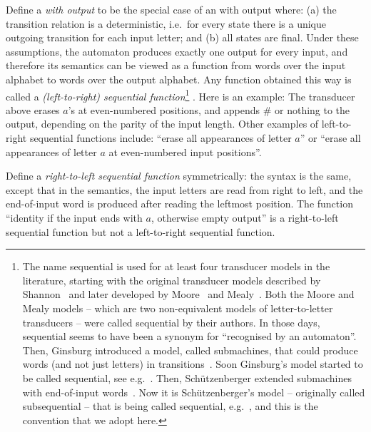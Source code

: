  Define a \emph{\dfa with output} to be the special case of an \nfa with output where: (a) the transition relation is a deterministic, i.e.~for every state there is a unique outgoing transition for each input letter; and (b) all states are final. Under these assumptions, the automaton produces exactly one output for every input, and therefore its  semantics can be viewed as a function from words over the input alphabet to words over the output alphabet. Any function obtained this way is called  a \emph{(left-to-right) sequential function}\footnote{ The name sequential is used for  at least four transducer models in the literature, starting with the original transducer models described by Shannon~\cite[Section 8]{shannon1948mathematical} and later developed by  Moore~\cite{Moore:gu}
  and Mealy~\cite{Mealy:1955hu}. Both the Moore and Mealy models -- which are two non-equivalent models of letter-to-letter transducers -- were called sequential by their authors. In those days, sequential seems to have been a synonym for ``recognised by an automaton''. Then, Ginsburg introduced a model, called submachines, that could produce  words (and not just letters) in transitions~\cite{Ginsburg:1960ca}. Soon Ginsburg's model started to be called sequential, see e.g.~\cite[p.~298]{Eilenberg:1974vl}. Then,  Sch\"utzenberger extended submachines with end-of-input words~\cite{Schutzenberger:1977ck}. Now  it is Sch\"utzenberger's model -- originally called subsequential -- that is  being called sequential, e.g.~\cite{Filiot:2016iw}, and this is the convention that we adopt here.   }
 .  Here is  an example: 
 The transducer above erases $a$'s at even-numbered positions, and appends $\#$ or nothing to the output, depending on the parity of the input length.
Other examples of  left-to-right sequential functions  include: ``erase all appearances of letter $a$'' or ``erase all appearances of letter $a$ at even-numbered input positions''.

  Define a \emph{right-to-left sequential function} symmetrically: the syntax is the same, except that in the semantics, the input letters are read from right to left, and the end-of-input word is produced after reading the leftmost position. The function ``identity if the input ends with $a$, otherwise empty output'' is a right-to-left sequential function but not a left-to-right sequential function.


 


